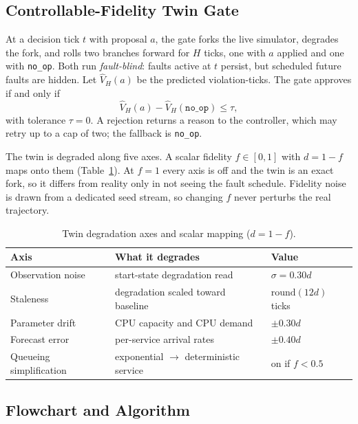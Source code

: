 \documentclass[conference]{IEEEtran}
\begin{document}
\subsection{Controllable-Fidelity Twin Gate}

At a decision tick $t$ with proposal $a$, the gate forks the live simulator, degrades the fork, and rolls two branches forward for $H$ ticks, one with $a$ applied and one with \texttt{no\_op}. Both run \emph{fault-blind}: faults active at $t$ persist, but scheduled future faults are hidden. Let $\hat{V}_H(a)$ be the predicted violation-ticks. The gate approves if and only if
\begin{equation}
\hat{V}_H(a) - \hat{V}_H(\texttt{no\_op}) \le \tau ,
\label{eq:gate}
\end{equation}
with tolerance $\tau = 0$. A rejection returns a reason to the controller, which may retry up to a cap of two; the fallback is \texttt{no\_op}.

The twin is degraded along five axes. A scalar fidelity $f \in [0,1]$ with $d = 1 - f$ maps onto them (Table~\ref{tab:fidelity}). At $f = 1$ every axis is off and the twin is an exact fork, so it differs from reality only in not seeing the fault schedule. Fidelity noise is drawn from a dedicated seed stream, so changing $f$ never perturbs the real trajectory.

\begin{table}[t]
\centering
\caption{Twin degradation axes and scalar mapping ($d = 1-f$).}
\label{tab:fidelity}
\footnotesize
\setlength{\tabcolsep}{3pt}
\begin{tabular}{@{}p{2.1cm}p{3.5cm}l@{}}
\toprule
Axis & What it degrades & Value \\
\midrule
Observation noise & start-state degradation read & $\sigma = 0.30d$ \\
Staleness & degradation scaled toward baseline & $\mathrm{round}(12d)$ ticks \\
Parameter drift & CPU capacity and CPU demand & $\pm 0.30d$ \\
Forecast error & per-service arrival rates & $\pm 0.40d$ \\
Queueing simplification & exponential $\to$ deterministic service & on if $f<0.5$ \\
\bottomrule
\end{tabular}
\end{table}

\subsection{Flowchart and Algorithm}
\end{document}
